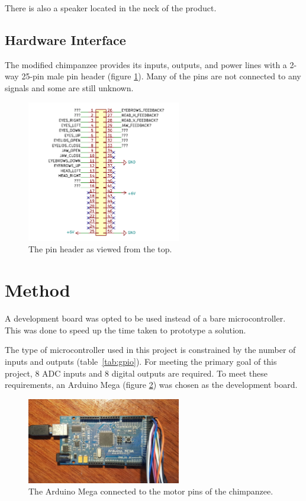 \documentclass[12pt]{article} %
\begin{document}
There is also a speaker located in the neck of the product.

\subsection{Hardware Interface}

The modified chimpanzee provides its inputs, outputs, and power lines with a 2-way 25-pin male pin header (figure \ref{fig:pinheader}).
Many of the pins are not connected to any signals and some are still unknown.

\begin{figure}[h]
	\center
	\includegraphics[width=0.6\textwidth]{pinheader}
	\caption{The pin header as viewed from the top.}
	\label{fig:pinheader}
\end{figure}

\section{Method}

A development board was opted to be used instead of a bare microcontroller.
This was done to speed up the time taken to prototype a solution.

The type of microcontroller used in this project is constrained by the number of inputs and outputs (table~\ref{tab:gpio}).
For meeting the primary goal of this project, 8 ADC inputs and 8 digital outputs are required.
To meet these requirements, an Arduino Mega (figure \ref{fig:arduino}) was chosen as the development board.

\begin{figure}[h]
	\center
	\includegraphics[width=0.6\textwidth]{arduino}
	\caption{The Arduino Mega connected to the motor pins of the chimpanzee.}
	\label{fig:arduino}
\end{figure}
\end{document}
